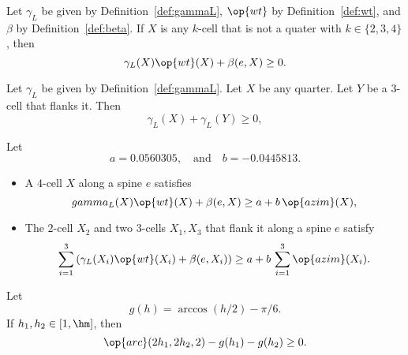 \begin{calculation}\label{calc:cc:qtr}
Let $\gamma_L$ be given by Definition~\ref{def:gammaL}, $\op{wt}$ by
Definition~\ref{def:wt}, and $\beta$ by Definition~\ref{def:beta}.
If $X$ is any $k$-cell that is not a quater with $k\in\{2,3,4\}$,
then %
\begin{displaymath}
\gamma_L(X) \op{wt}(X) + \beta(e,X)\ge 0.
\end{displaymath} 
\end{calculation}

\begin{calculation}\label{calc:cc:2bl}
Let $\gamma_L$ be given by Definition~\ref{def:gammaL}.  Let $X$ be
any quarter.  Let $Y$ be a $3$-cell that flanks it.  Then
\begin{displaymath}
\gamma_L(X)+\gamma_L(Y)\ge 0,
\end{displaymath}
\end{calculation}

\begin{calculation}\label{calc:cc:5bl}
Let
\begin{displaymath}
a= 0.0560305, \quad\text{and}\quad  b= -0.0445813.
\end{displaymath}
\begin{itemize}
\item {} A $4$-cell $X$ along a spine $e$ satisfies
\begin{displaymath}
gamma_L(X)\op{wt}(X) + \beta(e,X) \ge a + b\,\op{azim}(X),
\end{displaymath}
\item {} The $2$-cell $X_2$ and two $3$-cells $X_1,X_3$
that flank it along a spine $e$ satisfy
\begin{displaymath}
\sum_{i=1}^3 \left(\gamma_L(X_i)\op{wt}(X_i) + \beta(e,X_i)\right)\ge a + b\,\sum_{i=1}^3\op{azim}(X_i).
\end{displaymath}
\end{itemize}
\end{calculation}

\begin{calculation}\label{calc:cc:disks}\guid{}
Let
\begin{displaymath}
g(h) = \arccos(h/2) - \pi/6.
\end{displaymath}
If $h_1,h_2\in [1,\hm]$, then
\begin{displaymath}
\op{arc}(2h_1,2h_2,2) - g(h_1) - g(h_2)\ge 0.
\end{displaymath}
\end{calculation}

